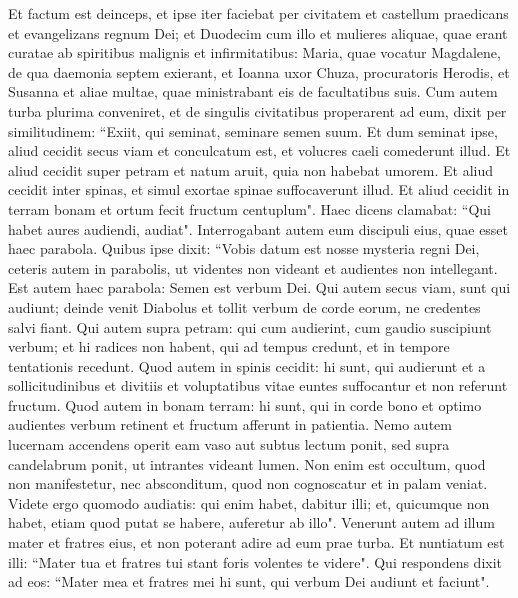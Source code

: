 \begin{biblechapter}  
\verse Et factum est deinceps, et ipse iter faciebat per civitatem et castellum praedicans et evangelizans regnum Dei; et Duodecim cum illo 
\verse et mulieres aliquae, quae erant curatae ab spiritibus malignis et infirmitatibus: Maria, quae vocatur Magdalene, de qua daemonia septem exierant, 
\verse et Ioanna uxor Chuza, procuratoris Herodis, et Susanna et aliae multae, quae ministrabant eis de facultatibus suis. 
\verse Cum autem turba plurima conveniret, et de singulis civitatibus properarent ad eum, dixit per similitudinem: 
\verse “Exiit, qui seminat, seminare semen suum. Et dum seminat ipse, aliud cecidit secus viam et conculcatum est, et volucres caeli comederunt illud. 
\verse Et aliud cecidit super petram et natum aruit, quia non habebat umorem. 
\verse Et aliud cecidit inter spinas, et simul exortae spinae suffocaverunt illud. 
\verse Et aliud cecidit in terram bonam et ortum fecit fructum centuplum". Haec dicens clamabat: “Qui habet aures audiendi, audiat". 
\verse Interrogabant autem eum discipuli eius, quae esset haec parabola. 
\verse Quibus ipse dixit: “Vobis datum est nosse mysteria regni Dei, ceteris autem in parabolis, ut videntes non videant et audientes non intellegant. 
\verse Est autem haec parabola: Semen est verbum Dei. 
\verse Qui autem secus viam, sunt qui audiunt; deinde venit Diabolus et tollit verbum de corde eorum, ne credentes salvi fiant. 
\verse Qui autem supra petram: qui cum audierint, cum gaudio suscipiunt verbum; et hi radices non habent, qui ad tempus credunt, et in tempore tentationis recedunt. 
\verse Quod autem in spinis cecidit: hi sunt, qui audierunt et a sollicitudinibus et divitiis et voluptatibus vitae euntes suffocantur et non referunt fructum. 
\verse Quod autem in bonam terram: hi sunt, qui in corde bono et optimo audientes verbum retinent et fructum afferunt in patientia. 
\verse Nemo autem lucernam accendens operit eam vaso aut subtus lectum ponit, sed supra candelabrum ponit, ut intrantes videant lumen. 
\verse Non enim est occultum, quod non manifestetur, nec absconditum, quod non cognoscatur et in palam veniat. 
\verse Videte ergo quomodo audiatis: qui enim habet, dabitur illi; et, quicumque non habet, etiam quod putat se habere, auferetur ab illo". 
\verse Venerunt autem ad illum mater et fratres eius, et non poterant adire ad eum prae turba. 
\verse Et nuntiatum est illi: “Mater tua et fratres tui stant foris volentes te videre". 
\verse Qui respondens dixit ad eos: “Mater mea et fratres mei hi sunt, qui verbum Dei audiunt et faciunt". 

\end{biblechapter}
